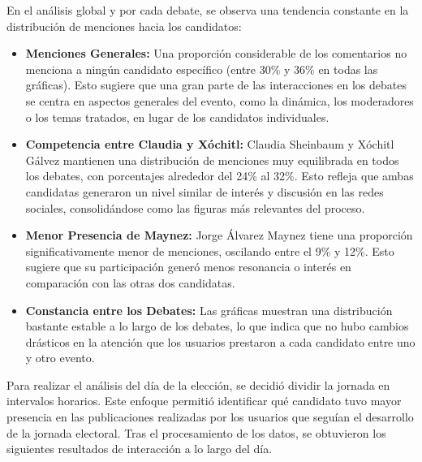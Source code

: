 \documentclass[10pt, a4paper]{article}
\begin{document}
	\newpage
	
	En el análisis global y por cada debate, se observa una tendencia constante en la distribución de menciones hacia los candidatos:
	
	\begin{itemize}
		\item \textbf{Menciones Generales:} Una proporción considerable de los comentarios no menciona a ningún candidato específico (entre 30\% y 36\% en todas las gráficas). Esto sugiere que una gran parte de las interacciones en los debates se centra en aspectos generales del evento, como la dinámica, los moderadores o los temas tratados, en lugar de los candidatos individuales.
		
		\item \textbf{Competencia entre Claudia y Xóchitl:} Claudia Sheinbaum y Xóchitl Gálvez mantienen una distribución de menciones muy equilibrada en todos los debates, con porcentajes alrededor del 24\% al 32\%. Esto refleja que ambas candidatas generaron un nivel similar de interés y discusión en las redes sociales, consolidándose como las figuras más relevantes del proceso.
		
		\item \textbf{Menor Presencia de Maynez:} Jorge Álvarez Maynez tiene una proporción significativamente menor de menciones, oscilando entre el 9\% y 12\%. Esto sugiere que su participación generó menos resonancia o interés en comparación con las otras dos candidatas.
		
		\item \textbf{Constancia entre los Debates:} Las gráficas muestran una distribución bastante estable a lo largo de los debates, lo que indica que no hubo cambios drásticos en la atención que los usuarios prestaron a cada candidato entre uno y otro evento.
	\end{itemize}

	Para realizar el análisis del día de la elección, se decidió dividir la jornada en intervalos horarios. Este enfoque permitió identificar qué candidato tuvo mayor presencia en las publicaciones realizadas por los usuarios que seguían el desarrollo de la jornada electoral. Tras el procesamiento de los datos, se obtuvieron los siguientes resultados de interacción a lo largo del día.
	
\end{document}
